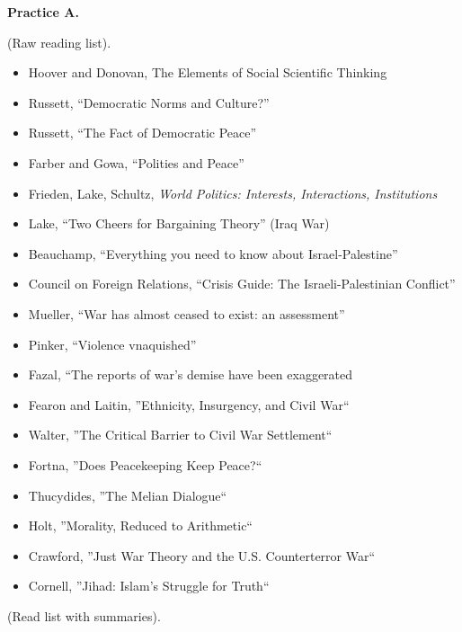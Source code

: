 \documentclass{article}
\begin{document}
  {\bf Practice A.}

  (Raw reading list).

  \begin{itemize}
    \item Hoover and Donovan, The Elements of Social Scientific Thinking
    \item Russett, ``Democratic Norms and Culture?''
    \item Russett, ``The Fact of Democratic Peace''
    \item Farber and Gowa, ``Polities and Peace''
    \item Frieden, Lake, Schultz, {\it World Politics: Interests, Interactions, Institutions}
    \item Lake, ``Two Cheers for Bargaining Theory'' (Iraq War)
    \item Beauchamp, ``Everything you need to know about Israel-Palestine''
    \item Council on Foreign Relations, ``Crisis Guide: The Israeli-Palestinian Conflict''
    \item Mueller, ``War has almost ceased to exist: an assessment''
    \item Pinker, ``Violence vnaquished''
    \item Fazal, ``The reports of war's demise have been exaggerated
    \item Fearon and Laitin, ''Ethnicity, Insurgency, and Civil War``
    \item Walter, ''The Critical Barrier to Civil War Settlement``
    \item Fortna, ''Does Peacekeeping Keep Peace?``
    \item Thucydides, ''The Melian Dialogue``
    \item Holt, ''Morality, Reduced to Arithmetic``
    \item Crawford, ''Just War Theory and the U.S. Counterterror War``
    \item Cornell, ''Jihad: Islam's Struggle for Truth``
  \end{itemize}

  (Read list with summaries).
\end{document}
